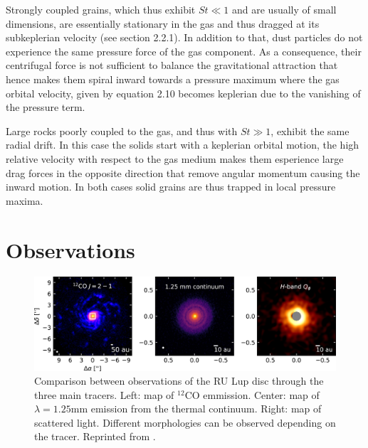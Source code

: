 \documentclass[a4paper,10pt]{report}
\begin{document}
Strongly coupled grains, which thus exhibit $St \ll 1$ and are usually of small dimensions,
are essentially stationary in the gas and thus dragged 
at its subkeplerian velocity (see section 2.2.1). In addition to that,
dust particles do not experience the same pressure force of the gas component.
As a consequence, their centrifugal force is not sufficient to balance the gravitational attraction 
that hence makes them spiral inward towards a pressure maximum where the gas orbital velocity, given by equation 
2.10 becomes keplerian due to the vanishing of the pressure term.

Large rocks poorly coupled to the gas, and thus with $St \gg 1$, exhibit the same radial drift. 
In this case the solids start with a keplerian orbital motion, the high relative velocity with respect to the gas
medium makes them esperience large drag forces in the opposite direction that remove angular momentum causing 
the inward motion. In both cases solid grains are thus trapped in local pressure maxima.

\section{Observations}

\begin{figure}
    \begin{center}
        \includegraphics[width=\textwidth]{images/2.2.tracers.comparison/apjaba1e1f9_hr.jpg}
    \end{center}
    \caption{Comparison between observations of the RU Lup disc through the three main tracers.
    Left: map of $^{12}$CO emmission. Center: map of $\lambda=1.25$mm emission from the thermal continuum.
    Right: map of scattered light. Different morphologies can be observed depending on the tracer.
    Reprinted from \citet{img_2.2}.}
\end{figure}
\end{document}
